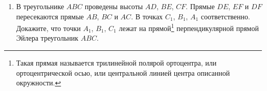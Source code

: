 \begin{enumerate}[resume*]
    \item В треугольнике $ABC$ проведены высоты $AD$, $BE$, $CF$. Прямые $DE$, $EF$ и $DF$ пересекаются прямые $AB$, $BC$ и $AC$. В точках $C_1$, $B_1$, $A_1$ соответственно. Докажите, что точки $A_1$, $B_1$, $C_1$ лежат на прямой\footnote{Такая прямая называется трилинейной полярой ортоцентра, или ортоцентрической осью, или центральной линией центра описанной окружности.} перпендикулярной прямой Эйлера треугольник $ABC$.


\end{enumerate}
